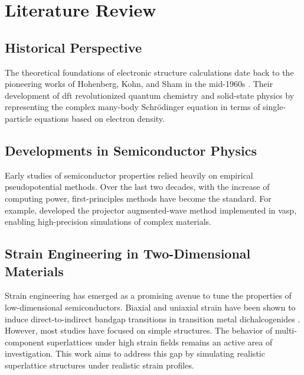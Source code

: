 \chapter{Literature Review}
\label{ch:lit_review}

\section{Historical Perspective}
The theoretical foundations of electronic structure calculations date back to the pioneering works of Hohenberg, Kohn, and Sham in the mid-1960s \citep{hohenberg1964, kohn1965}. Their development of \gls{dft} revolutionized quantum chemistry and solid-state physics by representing the complex many-body Schrödinger equation in terms of single-particle equations based on electron density.

\section{Developments in Semiconductor Physics}
Early studies of semiconductor properties relied heavily on empirical pseudopotential methods. Over the last two decades, with the increase of computing power, first-principles methods have become the standard. For example, \citet{kresse1996} developed the projector augmented-wave method implemented in \gls{vasp}, enabling high-precision simulations of complex materials.

\section{Strain Engineering in Two-Dimensional Materials}
Strain engineering has emerged as a promising avenue to tune the properties of low-dimensional semiconductors. Biaxial and uniaxial strain have been shown to induce direct-to-indirect bandgap transitions in transition metal dichalcogenides \citep{novoselov2005}. However, most studies have focused on simple structures. The behavior of multi-component superlattices under high strain fields remains an active area of investigation. This work aims to address this gap by simulating realistic superlattice structures under realistic strain profiles.
